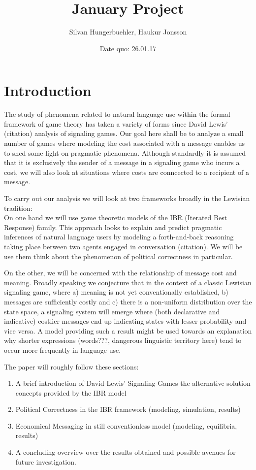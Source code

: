 \documentclass{article}
\title{January Project}
\author{Silvan Hungerbuehler, Haukur Jonsson}
\date{Date quo: 26.01.17}
\begin{document}
\maketitle
\section{Introduction}
The study of phenomena related to natural language use within the formal framework of game theory has taken a variety of forms since David Lewis' (citation) analysis of signaling games. Our goal here shall be to analyze a small number of games where modeling the cost associated with a message enables us to shed some light on pragmatic phenomena. Although standardly it is assumed that it is exclusively the sender of a message in a signaling game who incurs a cost, we will also look at situations where costs are conncected to a recipient of a message.

To carry out our analysis we will look at two frameworks broadly in the Lewisian tradition:\\
On one hand we will use game theoretic models of the IBR (Iterated Best Response) family. This approach looks to explain and predict pragmatic inferences of natural language users by modeling a forth-and-back reasoning taking place between two agents engaged in conversation (citation). We will be use them think about the phenomenon of political correctness in particular.

On the other, we will be concerned with the relationship of message cost and meaning. Broadly speaking we conjecture that in the context of a classic Lewisian signaling game, where a) meaning is not yet conventionally established, b) messages are sufficiently costly  and c) there is a non-uniform distribution over the state space, a signaling system will emerge where (both declarative and indicative) costlier messages end up indicating states with lesser probability and vice versa. A model providing such a result might be used towards an explanation why shorter expressions (words???, dangerous linguistic territory here) tend to occur more frequently in language use. 

The paper will roughly follow these sections:\\
\begin{enumerate}
\item A brief introduction of David Lewis' Signaling Games the alternative solution concepts provided by the IBR model
\item Political Correctness in the IBR framework (modeling, simulation, results)
\item Economical Messaging in still conventionless model (modeling, equilibria, results)
\item A concluding overview over the results obtained and possible avenues for future investigation.
\end{enumerate}
\end{document}
